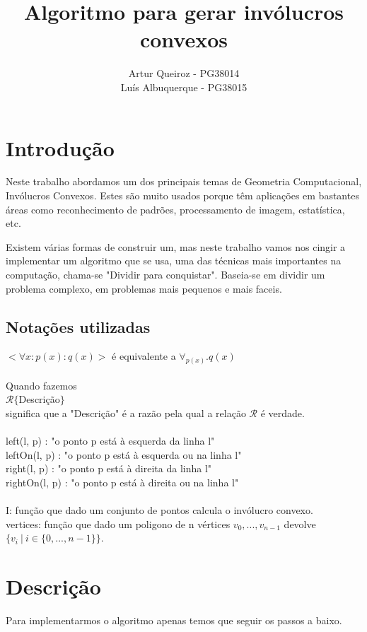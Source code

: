\documentclass[11pt]{article}
\title{Algoritmo para gerar invólucros convexos}
\author{Artur Queiroz - PG38014\\Luís Albuquerque - PG38015}
\begin{document}
\maketitle

\section{Introdução}
Neste trabalho abordamos um dos principais temas de Geometria 
Computacional, Invólucros Convexos.
Estes são muito usados porque têm aplicações em bastantes áreas
como reconhecimento de padrões, processamento de imagem, 
estatística, etc.

Existem várias formas de construir um, mas neste trabalho vamos
nos cingir a implementar um algoritmo que se usa, uma das 
técnicas mais importantes na computação, chama-se 
"Dividir para conquistar". Baseia-se em dividir um problema 
complexo, em problemas mais pequenos e mais faceis.

\subsection{Notações utilizadas}
$<\forall x : p(x) : q(x)>$ é equivalente a $\forall_{p(x)} . q(x)$\\ \\
Quando fazemos\\
$\mathcal{R}\{$Descrição$\}$\\
significa que a "Descrição" é a razão pela qual a relação $\mathcal{R}$
é verdade.\\ \\
left(l, p) : "o ponto p está à esquerda da linha l"\\
leftOn(l, p) : "o ponto p está à esquerda ou na linha l"\\
right(l, p) : "o ponto p está à direita da linha l"\\
rightOn(l, p) : "o ponto p está à direita ou na linha l"\\ \\
I: função que dado um conjunto de pontos calcula o invólucro convexo.\\ 
vertices: função que dado um poligono de n vértices $v_0,...,v_{n-1}$ devolve
$\{v_i\ |\ i \in \{0,...,n-1\}\}$.\\ 


\section{Descrição}
Para implementarmos o algoritmo apenas temos que seguir os passos
a baixo.
\end{document}
